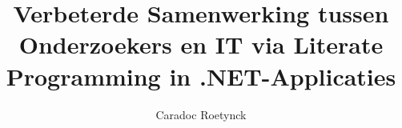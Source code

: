 \documentclass{hogent-article}
\title{Verbeterde Samenwerking tussen Onderzoekers en IT via Literate Programming in .NET-Applicaties}
\author{Caradoc Roetynck}
\begin{document}
\begin{abstract}






\end{abstract}
\end{document}
